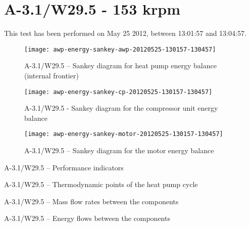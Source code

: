 
\section{A-3.1/W29.5 - 153 krpm}
\label{sec:awp-exp-details-A-3.1/W29.5}

This test has been performed on May 25\th{} 2012, between 13:01:57 and
13:04:57.

\begin{figure}[htbp]
  \centering
  \texttt{[image: awp-energy-sankey-awp-20120525-130157-130457]}
  \caption{A-3.1/W29.5 -- Sankey diagram for heat pump energy balance (internal frontier)}
  \label{fig:awp-A-3.1/W29.5-sankey-energy}
\end{figure}


\begin{figure}[htbp]
  \centering
  \texttt{[image: awp-energy-sankey-cp-20120525-130157-130457]}
  \caption{A-3.1/W29.5 - Sankey diagram for the compressor unit energy balance}
  \label{fig:awp-A-3.1/W29.5-sankey-cp}
\end{figure}

\begin{figure}[htbp]
  \centering
  \texttt{[image: awp-energy-sankey-motor-20120525-130157-130457]}
  \caption{A-3.1/W29.5 -- Sankey diagram for the motor energy balance}
  \label{fig:awp-A-3.1/W29.5-sankey-motor}
\end{figure}

\begin{table}[htbp]
    \footnotesize
    \begin{center}
    
  \end{center}
  \caption{A-3.1/W29.5 -- Performance indicators}
\end{table}

\begin{table}[htbp]
  \footnotesize
  \begin{center}
    
  \end{center}
  \caption{A-3.1/W29.5 -- Thermodynamic points of the heat pump cycle}
\end{table}


\begin{table}[htbp]
    \footnotesize
    \begin{center}
    
  \end{center}
  \caption{A-3.1/W29.5 -- Mass flow rates between the components}
\end{table}

\begin{table}[htbp]
    \footnotesize
    \begin{center}
    
  \end{center}
  \caption{A-3.1/W29.5 -- Energy flows between the components}
  \label{tab:awp-A-3.1/W29.5-dotEQ}
\end{table}

\FloatBarrier
